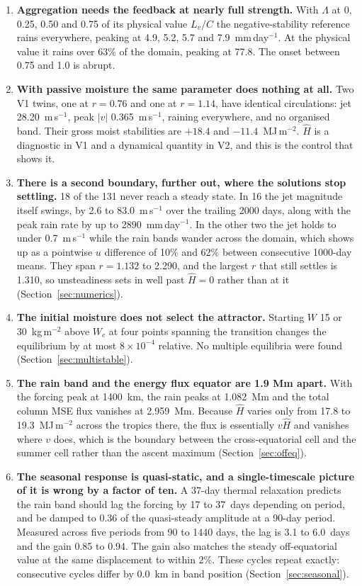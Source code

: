 \documentclass[11pt]{article}
\newcommand{\Hhat}{\hat{H}}
\newcommand{\mmday}{mm\,day$^{-1}$}
\newcommand{\ms}{m\,s$^{-1}$}
\begin{document}
\begin{enumerate}
\item \textbf{Aggregation needs the feedback at nearly full strength.} With
$\Lambda$ at 0, 0.25, 0.50 and 0.75 of its physical value $L_v/C$ the
negative-stability reference rains everywhere, peaking at 4.9, 5.2, 5.7 and
7.9~\mmday. At the physical value it rains over 63\% of the domain, peaking at
77.8. The onset between 0.75 and 1.0 is abrupt.

\item \textbf{With passive moisture the same parameter does nothing at all.}
Two V1 twins, one at $r = 0.76$ and one at $r = 1.14$, have identical
circulations: jet 28.20~\ms, peak $|v|$ 0.365~\ms, raining everywhere, and no
organised band. Their gross moist stabilities are $+18.4$ and
$-11.4$~MJ\,m$^{-2}$. $\Hhat$ is a diagnostic in V1 and a dynamical quantity in
V2, and this is the control that shows it.

\item \textbf{There is a second boundary, further out, where the solutions stop
settling.} 18 of the 131 never reach a steady state. In 16 the jet magnitude
itself swings, by 2.6 to 83.0~\ms{} over the trailing 2000 days, along with the
peak rain rate by up to 2890~\mmday. In the other two the jet holds to under
0.7~\ms{} while the rain bands wander across the domain, which shows up as a
pointwise $u$ difference of 10\% and 62\% between consecutive 1000-day means.
They span $r = 1.132$ to 2.290, and the largest $r$ that still settles is 1.310,
so unsteadiness sets in well past $\Hhat = 0$ rather than at it
(Section~\ref{sec:numerics}).

\item \textbf{The initial moisture does not select the attractor.} Starting $W$
15 or 30~kg\,m$^{-2}$ above $W_c$ at four points spanning the transition changes
the equilibrium by at most $8\times10^{-4}$ relative. No multiple equilibria
were found (Section~\ref{sec:multistable}).

\item \textbf{The rain band and the energy flux equator are 1.9 Mm apart.} With
the forcing peak at 1400~km, the rain peaks at 1.082~Mm and the total column MSE
flux vanishes at 2.959~Mm. Because $\Hhat$ varies only from 17.8 to
19.3~MJ\,m$^{-2}$ across the tropics there, the flux is essentially $v\Hhat$ and
vanishes where $v$ does, which is the boundary between the cross-equatorial cell
and the summer cell rather than the ascent maximum
(Section~\ref{sec:offeq}).

\item \textbf{The seasonal response is quasi-static, and a single-timescale
picture of it is wrong by a factor of ten.} A 37-day thermal relaxation predicts
the rain band should lag the forcing by 17 to 37~days depending on period, and
be damped to 0.36 of the quasi-steady amplitude at a 90-day period. Measured
across five periods from 90 to 1440 days, the lag is 3.1 to 6.0~days and the
gain 0.85 to 0.94. The gain also matches the steady off-equatorial value at the
same displacement to within 2\%. These cycles repeat exactly: consecutive cycles
differ by 0.0~km in band position (Section~\ref{sec:seasonal}).


\end{enumerate}
\end{document}

